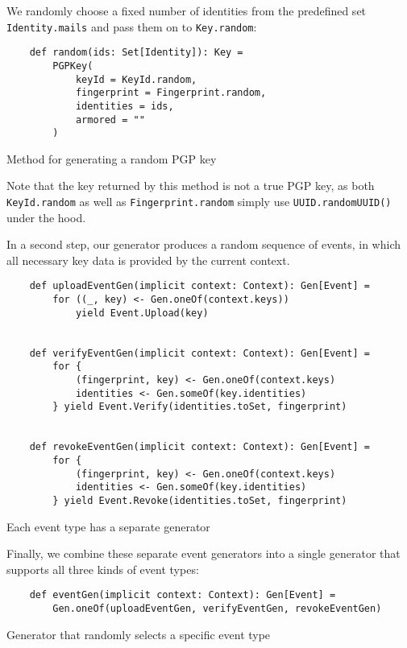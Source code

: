 We randomly choose a fixed number of identities from the predefined set \texttt{Identity.mails} and pass them on to \texttt{Key.random}: 
\begin{code}
    \begin{verbatim}
    def random(ids: Set[Identity]): Key =
        PGPKey(
            keyId = KeyId.random,
            fingerprint = Fingerprint.random,
            identities = ids,
            armored = ""
        )
    \end{verbatim}
    \caption{Method for generating a random PGP key}
\end{code}

Note that the key returned by this method is not a true PGP key, as both \texttt{KeyId.random} as well as \texttt{Fingerprint.random} simply use \texttt{UUID.randomUUID()} under the hood. 

In a second step, our generator produces a random sequence of events, in which all necessary key data is provided by the current context.
\begin{code}
    \begin{verbatim}
    def uploadEventGen(implicit context: Context): Gen[Event] =
        for ((_, key) <- Gen.oneOf(context.keys)) 
            yield Event.Upload(key)


    def verifyEventGen(implicit context: Context): Gen[Event] =
        for {
            (fingerprint, key) <- Gen.oneOf(context.keys)
            identities <- Gen.someOf(key.identities)
        } yield Event.Verify(identities.toSet, fingerprint)


    def revokeEventGen(implicit context: Context): Gen[Event] =
        for {
            (fingerprint, key) <- Gen.oneOf(context.keys)
            identities <- Gen.someOf(key.identities)
        } yield Event.Revoke(identities.toSet, fingerprint)
    \end{verbatim}
    \caption{Each event type has a separate generator}
\end{code}


Finally, we combine these separate event generators into a single generator that supports all three kinds of event types:
\begin{code}
    \begin{verbatim}
    def eventGen(implicit context: Context): Gen[Event] =
        Gen.oneOf(uploadEventGen, verifyEventGen, revokeEventGen)
    \end{verbatim}
    \caption{Generator that randomly selects a specific event type}
\end{code}


